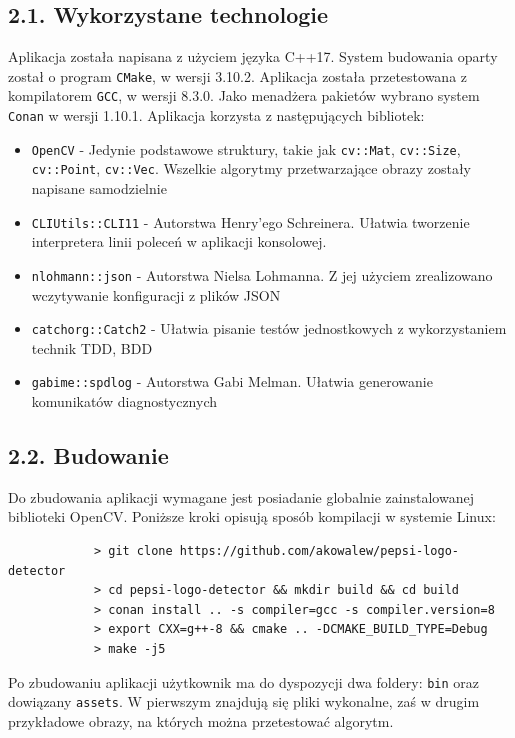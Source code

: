 \documentclass[11pt,a4paper,twoside]{report}
\begin{document}
	\subsection*{2.1. Wykorzystane technologie}

		Aplikacja została napisana z użyciem języka C++17. System budowania oparty został o program \texttt{CMake}, w wersji 3.10.2. Aplikacja została przetestowana z kompilatorem \texttt{GCC}, w wersji 8.3.0. Jako menadżera pakietów wybrano system \texttt{Conan} w wersji 1.10.1. Aplikacja korzysta z następujących bibliotek:
		\begin{itemize}
			\item \texttt{OpenCV} - Jedynie podstawowe struktury, takie jak \texttt{cv::Mat}, \texttt{cv::Size}, \texttt{cv::Point}, \texttt{cv::Vec}. Wszelkie algorytmy przetwarzające obrazy zostały napisane samodzielnie
			\item \texttt{CLIUtils::CLI11} - Autorstwa Henry'ego Schreinera. Ułatwia tworzenie interpretera linii poleceń w aplikacji konsolowej.
			\item \texttt{nlohmann::json} - Autorstwa Nielsa Lohmanna. Z jej użyciem zrealizowano wczytywanie konfiguracji z plików JSON
			\item \texttt{catchorg::Catch2} - Ułatwia pisanie testów jednostkowych z wykorzystaniem technik TDD, BDD
			\item \texttt{gabime::spdlog} - Autorstwa Gabi Melman. Ułatwia generowanie komunikatów diagnostycznych
		\end{itemize}

	\subsection*{2.2. Budowanie}

		Do zbudowania aplikacji wymagane jest posiadanie globalnie zainstalowanej biblioteki OpenCV. Poniższe kroki opisują sposób kompilacji w systemie Linux:
		\begin{verbatim}
			> git clone https://github.com/akowalew/pepsi-logo-detector
			> cd pepsi-logo-detector && mkdir build && cd build
			> conan install .. -s compiler=gcc -s compiler.version=8
			> export CXX=g++-8 && cmake .. -DCMAKE_BUILD_TYPE=Debug
			> make -j5
		\end{verbatim}

		Po zbudowaniu aplikacji użytkownik ma do dyspozycji dwa foldery: \texttt{bin} oraz dowiązany \texttt{assets}. W pierwszym znajdują się pliki wykonalne, zaś w drugim przykładowe obrazy, na których można przetestować algorytm.
\end{document}
